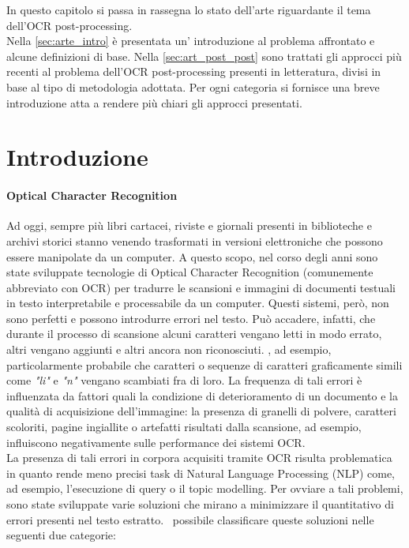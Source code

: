 In questo capitolo si passa in rassegna lo stato dell'arte riguardante il tema dell'OCR post-processing.\\
Nella \autoref{sec:arte_intro} è presentata un' introduzione al problema affrontato e alcune definizioni di base. Nella \autoref{sec:art_post_post} sono trattati gli approcci più recenti al problema dell'OCR post-processing presenti in letteratura, divisi in base al tipo di metodologia adottata. Per ogni categoria si fornisce una breve introduzione atta a rendere più chiari gli approcci presentati.

\section{Introduzione}
\label{sec:arte_intro}
\paragraph{Optical Character Recognition}
Ad oggi, sempre più libri cartacei, riviste e giornali presenti in biblioteche e archivi storici stanno venendo trasformati in versioni elettroniche che possono essere manipolate da un computer. A questo scopo, nel corso degli anni sono state sviluppate tecnologie di Optical Character Recognition (comunemente abbreviato con OCR) per tradurre le scansioni e immagini di documenti testuali in testo interpretabile e processabile da un computer. Questi sistemi, però, non sono perfetti e possono introdurre errori nel testo. Può accadere, infatti, che durante il processo di scansione alcuni caratteri vengano letti in modo errato, altri vengano aggiunti e altri ancora non riconosciuti. \E, ad esempio, particolarmente probabile che caratteri o sequenze di caratteri graficamente simili come \textit{"li"} e \textit{"n"} vengano scambiati fra di loro\cite{ocr_error_analysis}. La frequenza di tali errori è influenzata da fattori quali la condizione di deterioramento di un documento e la qualità di acquisizione dell'immagine\cite{hartley1999quality}: la presenza di granelli di polvere, caratteri scoloriti, pagine ingiallite o artefatti risultati dalla scansione, ad esempio, influiscono negativamente sulle performance dei sistemi OCR.\\
La presenza di tali errori in corpora acquisiti tramite OCR risulta problematica in quanto rende meno precisi task di Natural Language Processing (NLP) come, ad esempio, l'esecuzione di query \cite{impatto_ocr_1} o il topic modelling\cite{impatto_ocr_2}. Per ovviare a tali problemi, sono state sviluppate varie soluzioni che mirano a minimizzare il quantitativo di errori presenti nel testo estratto. \E\ possibile classificare queste soluzioni nelle seguenti due categorie:
